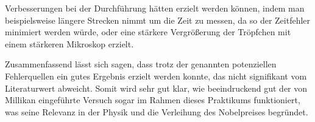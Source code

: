 \documentclass{article}
\begin{document}
Verbesserungen bei der Durchführung hätten erzielt werden können, indem man beispielsweise längere Strecken nimmt um die Zeit zu messen, da so der Zeitfehler minimiert werden würde, oder eine stärkere Vergrößerung der Tröpfchen mit einem stärkeren Mikroskop erzielt. 

Zusammenfassend lässt sich sagen, dass trotz der genannten potenziellen Fehlerquellen ein gutes Ergebnis erzielt werden konnte, das nicht signifikant vom Literaturwert abweicht. Somit wird sehr gut klar, wie beeindruckend gut der von Millikan eingeführte Versuch sogar im Rahmen dieses Praktikums funktioniert, was seine Relevanz in der Physik und die Verleihung des Nobelpreises begründet. 
\end{document}
